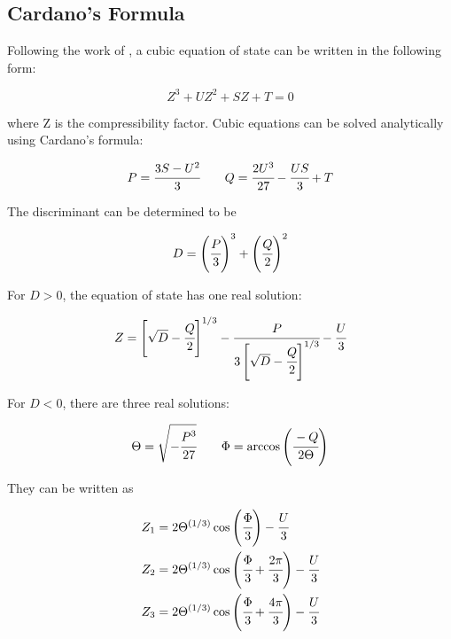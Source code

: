 \documentclass[a4paper,fleqn]{cas-dc}
\begin{document}
\subsection{Cardano's Formula} \label{CH: Cardano}

Following the work of \citet{Gmehling2019}, a cubic equation of state can be written in the following form:

{\footnotesize
	\begin{equation}
		Z^3 + UZ^2+ SZ + T = 0
	\end{equation}
}

where Z is the compressibility factor. Cubic equations can be solved analytically using Cardano's formula:

{\footnotesize
	\begin{equation*}
		P = \cfrac{3S-U^2}{3} \qquad Q = \cfrac{2U^3}{27}-\cfrac{US}{3} + T
	\end{equation*}
}

The discriminant can be determined to be

{\footnotesize
	\begin{equation}
		D = \left( \cfrac{P}{3} \right)^3 + \left( \cfrac{Q}{2} \right)^2
	\end{equation}
}

For $D>0$, the equation of state has one real solution:

{\footnotesize
	\begin{equation}
		Z = \left[ \sqrt{D} - \cfrac{Q}{2} \right]^{1/3} - \cfrac{P}{ 3 \left[ \sqrt{D}-\cfrac{Q}{2} \right]^{1/3} } - \cfrac{U}{3}
	\end{equation}
}

For $D<0$, there are three real solutions:

{\footnotesize
	\begin{equation*}
		\Theta = \sqrt{-\cfrac{P^3}{27}} \qquad \Phi = \arccos\left( \cfrac{-Q}{2\Theta} \right)
	\end{equation*}
}

They can be written as

{\footnotesize
	\begin{align}
		Z_1 &= 2\Theta^{(1/3)} \cos \left( \cfrac{\Phi}{3} \right) - \cfrac{U}{3} \\
		Z_2 &= 2\Theta^{(1/3)} \cos \left( \cfrac{\Phi}{3} + \cfrac{2\pi}{3} \right) - \cfrac{U}{3} \\
		Z_3 &= 2\Theta^{(1/3)} \cos \left( \cfrac{\Phi}{3} + \cfrac{4\pi}{3} \right) - \cfrac{U}{3} 
	\end{align}
}
\end{document}
